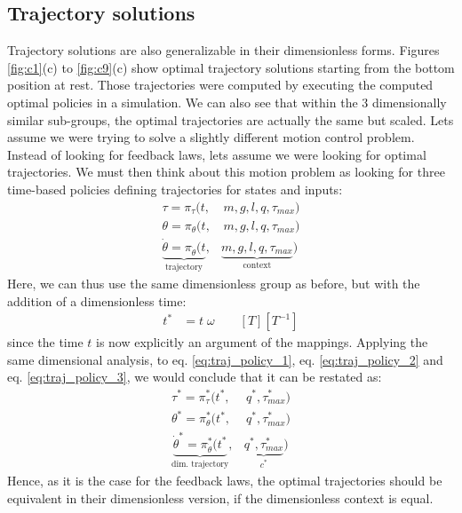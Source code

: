 \subsection{Trajectory solutions}

Trajectory solutions are also generalizable in their dimensionless forms. Figures \ref{fig:c1}(c) to \ref{fig:c9}(c) show optimal trajectory solutions starting from the bottom position at rest. Those trajectories were computed by executing the computed optimal policies in a simulation. We can also see that within the 3 dimensionally similar sub-groups, the optimal trajectories are actually the same but scaled. Lets assume we were trying to solve a slightly different motion control problem. Instead of looking for feedback laws, lets assume we were looking for optimal trajectories. We must then think about this motion problem as looking for three time-based policies defining trajectories for states and inputs:
\begin{align}
\tau          = \pi_{\tau}( t , &
 \, m , g , l , q , \tau_{max} )  \label{eq:traj_policy_1}\\
\theta        = \pi_{\theta}( t ,&
 \, m , g , l , q , \tau_{max} )
\label{eq:traj_policy_2}\\
\underbrace{
\dot{\theta } = \pi_{\dot{\theta }}( t 
 }_{\text{trajectory}} ,&
\underbrace{
m , g , l , q , \tau_{max} 
 }_{\text{context}} )
 \label{eq:traj_policy_3}
\end{align}
Here, we can thus use the same dimensionless group as before, but with the addition of a dimensionless time:
\begin{align}
t^* &= t \; \omega \quad \quad [T][T^{-1}]
\end{align}
since the time $t$ is now explicitly an argument of the mappings. Applying the same dimensional analysis, to eq. \eqref{eq:traj_policy_1}, eq. \eqref{eq:traj_policy_2} and eq. \eqref{eq:traj_policy_3}, we would conclude that it can be restated as:
\begin{align}
\tau^*          = \pi^*_{\tau}( t^* , &
 \, q^* , \tau_{max}^* )  \label{eq:dim_traj_policy_1}\\
\theta^*        = \pi^*_{\theta}( t^* ,&
 \, q^* , \tau_{max}^* )
\label{eq:dim_traj_policy_2}\\
\underbrace{
\dot{\theta }^* = \pi^*_{\dot{\theta }}( t^* 
}_{\text{dim. trajectory}} ,&
\underbrace{
 q^* , \tau_{max}^*
 }_{c^*} )
 \label{eq:dim_traj_policy_3}
\end{align}
Hence, as it is the case for the feedback laws, the optimal trajectories should be equivalent in their dimensionless version, if the dimensionless context is equal. 



